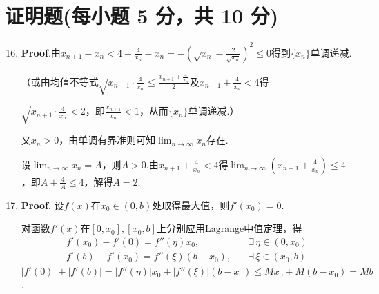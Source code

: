 \documentclass[../main.tex]{subfiles}
\begin{document}
\section{证明题(每小题 5 分，共 10 分)}
\begin{enumerate}
    \setcounter{enumi}{15}
    \item \textbf{Proof}.由$x_{n+1}-x_{n}<4-\frac{4}{x_{n}}-x_{n}=-\left(\sqrt{x_{n}}
              -\frac{2}{\sqrt{x_{n}}}\right)^{2}\leq0$得到$\{x_{n}\}$单调递减.

          （或由均值不等式$\sqrt{x_{n+1}\cdot\frac{4}{x_n}}\leq\frac{x_{n+1}+\frac{4}{x_n}}{2}$及$x
                  _{n+1}+\frac{4}{x_{n}}<4$得

          $\sqrt{x_{n+1}\cdot\frac{4}{x_n}}<2$，即$\frac{x_{n+1}}{x_{n}}<1$，从而$\{x
                  _{n}\}$单调递减.）

          又$x_{n}>0$，由单调有界准则可知$\lim_{n\to\infty}x_{n}$存在.

          设$\lim_{n\to\infty}x_{n}=A$，则$A>0$.由$x_{n+1}+\frac{4}{x_{n}}<4$得$\lim_{n\to\infty}
              \left(x_{n+1}+\frac{4}{x_{n}}\right)\leq 4$，即$A+\frac{4}{A}\leq4$，解得$A
              =2$.

    \item \textbf{Proof}. 设$f(x)$在$x_{0}\in(0,b)$处取得最大值，则$f'(x_{0}
              )=0$.

          对函数$f'(x)$在$[0,x_{0}],[x_{0},b]$上分别应用Lagrange中值定理，得
          \[
              \begin{aligned}
                  f'(x_{0})-f'(0)=f''(\eta)x_{0},\quad    & \exists\,\eta\in(0,x_{0}) \\
                  f'(b)-f'(x_{0})=f''(\xi)(b-x_{0}),\quad & \exists\,\xi\in(x_{0},b)
              \end{aligned}
          \]
          $|f'(0)|+|f'(b)|=|f''(\eta)|x_{0}+|f''(\xi)|(b-x_{0})\leq Mx_{0}+M(b-x_{0})
              =Mb$.
\end{enumerate}
\end{document}
